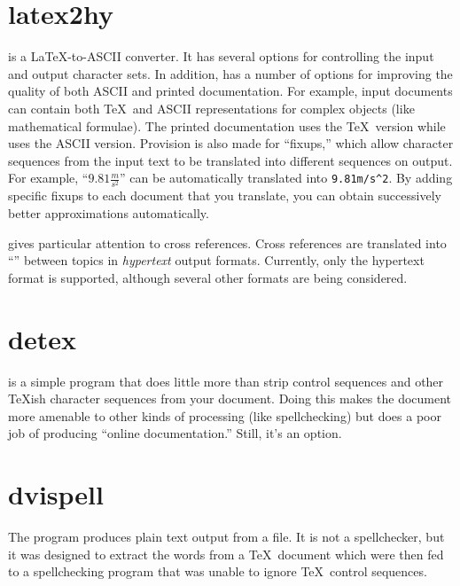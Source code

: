\section{latex2hy}

 is 
a \LaTeX-to-ASCII converter.  It has several
options for controlling the input and output character sets.  In
addition,  has a number of options for improving the
quality of both ASCII and printed documentation.  For example, input
documents can contain both \TeX\ and ASCII representations for complex
objects (like mathematical formulae).  The printed documentation uses
the \TeX\ version while  uses the ASCII version.
Provision is also made for ``fixups,'' which allow character sequences
from the input text to be translated into different sequences on
output.  For example, ``$9.81\frac{m}{s^2}$'' can be automatically
translated into \verb|9.81m/s^2|.  By adding specific fixups to each
document that you translate, you can obtain successively better 
approximations automatically.

 gives particular attention to 
cross references.
Cross references are translated into ``''
between topics in \emph{hypertext} output formats.  Currently, only the
 hypertext format is supported, although several
other formats are being considered.

\section{detex}

 is a simple program that does little more than strip
control sequences and other \TeX{}ish character sequences from your document.
Doing this makes the document more amenable to other kinds of processing (like
spellchecking) but does a poor job of producing ``online documentation.''
Still, it's an option.

\section{dvispell}

The  program produces plain text output from a 
file.  It is not a spellchecker, but it was designed to extract the
words from a \TeX\ document which were then fed to a spellchecking
program that was unable to ignore \TeX\ control sequences.

